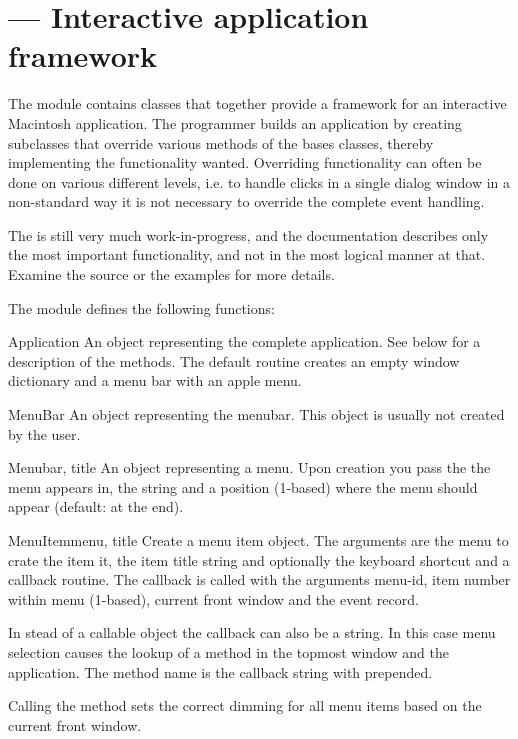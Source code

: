 \section{ ---
         Interactive application framework}



The  module contains classes that together provide a
framework for an interactive Macintosh application. The programmer
builds an application by creating subclasses that override various
methods of the bases classes, thereby implementing the functionality
wanted. Overriding functionality can often be done on various
different levels, i.e. to handle clicks in a single dialog window in a
non-standard way it is not necessary to override the complete event
handling.

The  is still very much work-in-progress, and the
documentation describes only the most important functionality, and not
in the most logical manner at that. Examine the source or the examples
for more details.

The  module defines the following functions:


\begin{funcdesc}{Application}{}
An object representing the complete application. See below for a
description of the methods. The default  routine
creates an empty window dictionary and a menu bar with an apple menu.
\end{funcdesc}

\begin{funcdesc}{MenuBar}{}
An object representing the menubar. This object is usually not created
by the user.
\end{funcdesc}

\begin{funcdesc}{Menu}{bar, title}
An object representing a menu. Upon creation you pass the
 the menu appears in, the  string and a
position (1-based)  where the menu should appear (default:
at the end).
\end{funcdesc}

\begin{funcdesc}{MenuItem}{menu, title}
Create a menu item object. The arguments are the menu to crate the
item it, the item title string and optionally the keyboard shortcut
and a callback routine. The callback is called with the arguments
menu-id, item number within menu (1-based), current front window and
the event record.

In stead of a callable object the callback can also be a string. In
this case menu selection causes the lookup of a method in the topmost
window and the application. The method name is the callback string
with  prepended.

Calling the   method sets the
correct dimming for all menu items based on the current front window.
\end{funcdesc}

